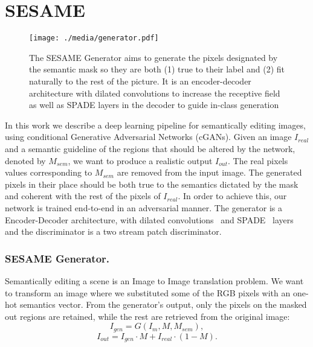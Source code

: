 \documentclass[runningheads]{llncs}
\begin{document}
\section{SESAME}
\label{sec:proposed_approach}

\begin{figure}[t]
\begin{center}
    \centering
    \texttt{[image: ./media/generator.pdf]}
    \caption{The SESAME Generator aims to generate the pixels designated by the semantic mask so they are both (1) true to their label and (2) fit naturally to the rest of the picture.
    It is an encoder-decoder architecture with dilated convolutions to increase the receptive field as well as SPADE layers in the decoder to guide in-class generation}
    \label{fig:generator}
\end{center}
\end{figure}

In this work we describe a deep learning pipeline for semantically editing images, using conditional Generative Adversarial Networks (cGANs). 
 Given an image $I_{real}$ and a semantic guideline of the regions that should be altered by the network, denoted by $M_{sem}$, we want to produce a realistic output $I_{out}$. 
The real pixels values corresponding to $M_{sem}$ are removed from the input image. The generated pixels in their place should be both true to the semantics dictated by the mask and coherent with the rest of the pixels of $I_{real}$.
In order to achieve this, our network is trained end-to-end in an adversarial manner. The generator is a Encoder-Decoder architecture, with dilated convolutions~\cite{Yu2016} and SPADE~\cite{park2019SPADE} layers and the discriminator is a two stream patch discriminator.

\subsubsection{SESAME Generator.} 
\label{ss:generator}

Semantically editing a scene is an Image to Image translation problem. 
We want to transform an image where we substituted some of the RGB pixels with an one-hot semantics vector. From the generator's output, only the pixels on the masked out regions are retained, while the rest are retrieved from the original image:
\begin{equation}
 I_{gen} = G(I_m, M, M_{sem}),
\end{equation}
\begin{equation}
 I_{out} = I_{gen} \cdot M + I_{real} \cdot (1-M).
\end{equation}
\end{document}
